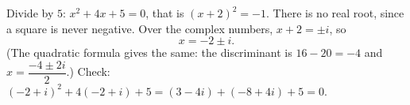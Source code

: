 Divide by $5$: $x^2+4x+5=0$, that is $(x+2)^2=-1$. There is no real root, since a square is never negative. Over the complex numbers, $x+2=\pm i$, so
\[
x=\boxed{-2\pm i}.
\]
(The quadratic formula gives the same: the discriminant is $16-20=-4$ and $x=\dfrac{-4\pm2i}{2}$.) Check: $(-2+i)^2+4(-2+i)+5=(3-4i)+(-8+4i)+5=0$.
